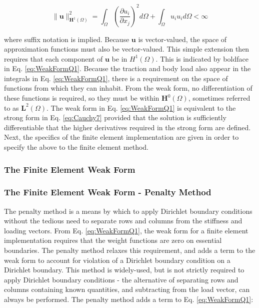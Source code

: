 \documentclass[10pt]{article}
\begin{document}
\begin{equation}
\|\textbf{u}\|^2_{\textbf{H}^1(\Omega)}=\int_{\Omega}\left(\frac{\partial u_i}{\partial x_j}\right)^2d\Omega+\int_{\Omega}u_iu_id\Omega<\infty
\end{equation}

where suffix notation is implied. Because \(\textbf{u}\) is vector-valued, the space of approximation functions must also be vector-valued. This simple extension then requires that each component of \(\textbf{u}\) be in \(H^1(\Omega)\). This is indicated by boldface in Eq. \eqref{eq:WeakFormQ1}. Because the traction and body load also appear in the integrals in Eq. \eqref{eq:WeakFormQ1}, there is a requirement on the space of functions from which they can inhabit. From the weak form, no differentiation of these functions is required, so they must be within \(\textbf{H}^0(\Omega)\), sometimes referred to as \(\textbf{L}^2(\Omega)\). The weak form in Eq. \eqref{eq:WeakFormQ1} is equivalent to the strong form in Eq. \eqref{eq:Cauchy7} provided that the solution is sufficiently differentiable that the higher derivatives required in the strong form are defined. Next, the specifics of the finite element implementation are given in order to specify the above to the finite element method.

\subsubsection{The Finite Element Weak Form}

\subsubsection{The Finite Element Weak Form - Penalty Method}

The penalty method is a means by which to apply Dirichlet boundary conditions without the tedious need to separate rows and columns from the stiffness and loading vectors. From Eq. \eqref{eq:WeakFormQ1}, the weak form for a finite element implementation requires that the weight functions are zero on essential boundaries. The penalty method relaxes this requirement, and adds a term to the weak form to account for violation of a Dirichlet boundary condition on a Dirichlet boundary. This method is widely-used, but is not strictly required to apply Dirichlet boundary conditions - the alternative of separating rows and columns containing known quantities, and subtracting from the load vector, can always be performed. The penalty method adds a term to Eq. \eqref{eq:WeakFormQ1}:
\end{document}
